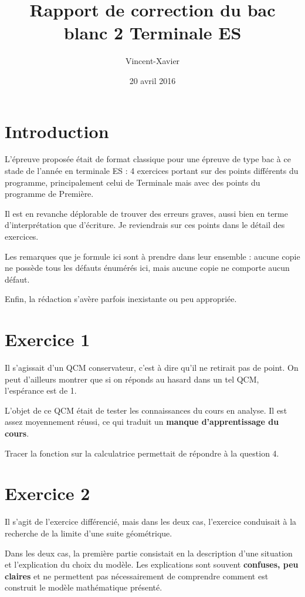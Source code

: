 \documentclass[a4paper,12Pt,french]{article}
\title{Rapport de correction du bac blanc 2 Terminale ES}
\author{Vincent-Xavier \bsc{Jumel}}
\date{20 avril 2016}
\begin{document}
\maketitle

\section*{Introduction}

L'épreuve proposée était de format classique pour une épreuve de type
bac à ce stade de l'année en terminale ES : 4 exercices portant sur des
points différents du programme, principalement celui de Terminale mais
avec des points du programme de Première.

Il est en revanche déplorable de trouver des erreurs graves, aussi bien
en terme d'interprétation que d'écriture. Je reviendrais sur ces points
dans le détail des exercices.

Les remarques que je formule ici sont à prendre dans leur ensemble :
aucune copie ne possède tous les défauts énumérés ici, mais aucune copie
ne comporte aucun défaut.

Enfin, la rédaction s'avère parfois inexistante ou peu appropriée.

\section{Exercice 1}

Il s'agissait d'un QCM conservateur, c'est à dire qu'il ne retirait pas
de point. On peut d'ailleurs montrer que si on réponds au hasard dans un
tel QCM, l'espérance est de 1.

L'objet de ce QCM était de tester les connaissances du cours en analyse.
Il est assez moyennement réussi, ce qui traduit un \textbf{manque
d'apprentissage du cours}.

Tracer la fonction sur la calculatrice permettait de répondre à la
question 4.

\section{Exercice 2}

Il s'agit de l'exercice différencié, mais dans les deux cas, l'exercice
conduisait à la recherche de la limite d'une suite géométrique.

Dans les deux cas, la première partie consistait en la description d'une
situation et l'explication du choix du modèle. Les explications sont
souvent \textbf{confuses, peu claires} et ne permettent pas
nécessairement de comprendre comment est construit le modèle
mathématique présenté.
\end{document}
